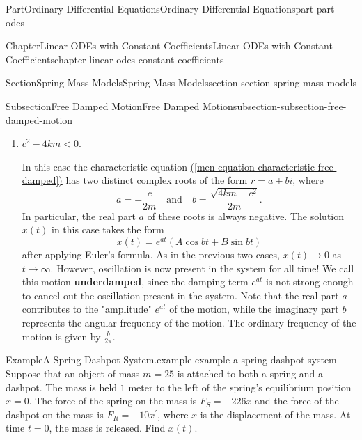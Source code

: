 \documentclass[twoside,10pt,]{book}
\newcommand{\xreffont}{\relax}
\newcommand{\terminology}[1]{\textbf{#1}}
\numberwithin{equation}{part}
\newcommand{\lt}{<}
\begin{document}
\begin{partptx}{Part}{Ordinary Differential Equations}{}{Ordinary Differential Equations}{}{}{part-part-odes}
\begin{chapterptx}{Chapter}{Linear ODEs with Constant Coefficients}{}{Linear ODEs with Constant Coefficients}{}{}{chapter-linear-odes-constant-coefficients}
\begin{sectionptx}{Section}{Spring-Mass Models}{}{Spring-Mass Models}{}{}{section-section-spring-mass-models}
\begin{subsectionptx}{Subsection}{Free Damped Motion}{}{Free Damped Motion}{}{}{subsection-subsection-free-damped-motion}
\begin{enumerate}[label=\arabic*:]
In this case, the characteristic equation \hyperref[men-equation-characteristic-free-damped]{({\xreffont\ref{men-equation-characteristic-free-damped}})} has a repeated (real) root, and so the solution \(x(t)\) takes the form%
\begin{equation*}
x(t) = e^{r_{1}t}(c_{1} + c_{2}t).
\end{equation*}
This mass can pass through \(x = 0\) only once, at \(t = -\frac{c_{1}}{c_{2}}\). Once it does, the mass will "turn around" soon afterwards and beginning moving back to \(0\), as in the first case. We call this type of motion \terminology{critically damped}, since it's right on the border between overdamped motion and oscillating motion.%
\item{}\(c^{2} - 4km \lt 0\).%
\par
In this case the characteristic equation \hyperref[men-equation-characteristic-free-damped]{({\xreffont\ref{men-equation-characteristic-free-damped}})} has two distinct complex roots of the form \(r = a \pm bi\), where%
\begin{equation*}
a = -\frac{c}{2m}\quad\text{and}\quad b = \frac{\sqrt{4km - c^{2}}}{2m}.
\end{equation*}
In particular, the real part \(a\) of these roots is always negative. The solution \(x(t)\) in this case takes the form%
\begin{equation*}
x(t) = e^{at}(A\cos bt + B\sin bt)
\end{equation*}
after applying Euler's formula. As in the previous two cases, \(x(t)\to0\) as \(t\to\infty\). However, oscillation is now present in the system for all time! We call this motion \terminology{underdamped}, since the damping term \(e^{at}\) is not strong enough to cancel out the oscillation present in the system. Note that the real part \(a\) contributes to the "amplitude" \(e^{at}\) of the motion, while the imaginary part \(b\) represents the angular frequency of the motion. The ordinary frequency of the motion is given by \(\frac{b}{2\pi}\).%
\end{enumerate}
\begin{example}{Example}{A Spring-Dashpot System.}{example-example-a-spring-dashpot-system}%
Suppose that an object of mass \(m = 25\) is attached to both a spring and a dashpot. The mass is held \(1\) meter to the left of the spring's equilibrium position \(x = 0\). The force of the spring on the mass is \(F_{S} = -226x\) and the force of the dashpot on the mass is \(F_{R} = -10x^\prime\), where \(x\) is the displacement of the mass. At time \(t = 0\), the mass is released. Find \(x(t)\).%

\end{example}
\end{subsectionptx}
\end{sectionptx}
\end{chapterptx}
\end{partptx}
\end{document}
